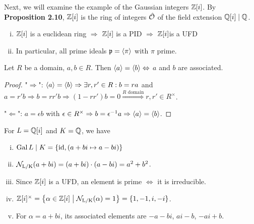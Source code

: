 
Next, we will examine the example of the Gaussian integers $\mathbb{Z}[i]$. By \textbf{Proposition 2.10}, $\mathbb{Z}[i]$ is the ring of integers $\hat{\mathcal{O}}$ of the field extension $\mathbb{Q}[i] \mid \mathbb{Q}$. 

\begin{remin}
	\begin{enumerate}[(i)]
		\item $\mathbb{Z}[i]$ is a euclidean ring $\Rightarrow$ $\mathbb{Z}[i]$ is a PID $\Rightarrow$ $\mathbb{Z}[i] $is a UFD
		
		\item In particular, all prime ideals $\mathfrak{p} = \left\langle {\pi} \right\rangle$ with $\pi$ prime.
	\end{enumerate}
\end{remin}

\begin{Bem}
	Let $R$ be a domain, $a,b \in R$. Then $\left\langle {a} \right\rangle = \left\langle {b} \right\rangle \Leftrightarrow$ $a$ and $b$ are associated.
\end{Bem}
\begin{proof}
	"$\Rightarrow$": $\left\langle {a} \right\rangle = \left\langle {b} \right\rangle \Rightarrow \exists r,r' \in R: b = ra$ and $a = r'b \Rightarrow b = rr'b \Rightarrow (1-rr')b = 0 \overset{R \text{ domain}}{\Rightarrow} r,r' \in R^\times$.
	
	"$\Leftarrow$": $a = \epsilon b$ with $\epsilon \in R^\times \Rightarrow b = \epsilon^{-1}a \Rightarrow \left\langle {a} \right\rangle = \left\langle {b} \right\rangle$.
\end{proof}

\begin{Bem}
	For $L = \mathbb{Q}[i]$ and $K = \mathbb{Q}$, we have
	\begin{enumerate}[(i)]
		\item $\operatorname{Gal} L \mid K = \left\lbrace \operatorname{id}, (a+bi \mapsto a-bi) \right\rbrace$
		
		\item $\operatorname{\mathcal{N}_{L/K}} (a+bi) = (a+bi) \cdot (a-bi) = a^2 + b^2$.
		
		\item Since $\mathbb{Z}[i]$ is a UFD, an element is prime $\Leftrightarrow$ it is irreducible.
		
		\item $\mathbb{Z}[i]^\times = \left\{ {\alpha \in \mathbb{Z}[i]} \bigm| {\operatorname{\mathcal{N}_{L/K}} (\alpha) = 1} \right\} = \left\lbrace 1, -1, i, -i \right\rbrace$.
		
		\item For $\alpha = a+bi$, its associated elements are $-a-bi$, $ai-b$, $-ai+b$.
	\end{enumerate}
\end{Bem}

